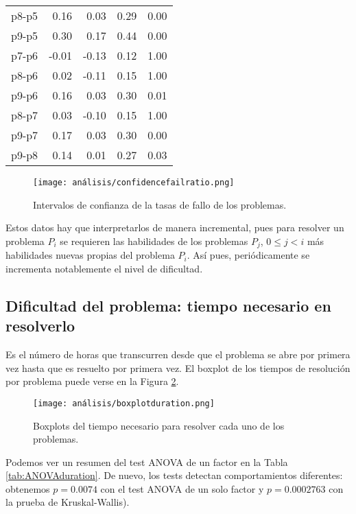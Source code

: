 \begin{table}[H]
\begin{tabular}{rrrrr}
  p8-p5 & 0.16 & 0.03 & 0.29 & 0.00 \\ 
  p9-p5 & 0.30 & 0.17 & 0.44 & 0.00 \\ 
  p7-p6 & -0.01 & -0.13 & 0.12 & 1.00 \\ 
  p8-p6 & 0.02 & -0.11 & 0.15 & 1.00 \\ 
  p9-p6 & 0.16 & 0.03 & 0.30 & 0.01 \\ 
  p8-p7 & 0.03 & -0.10 & 0.15 & 1.00 \\ 
  p9-p7 & 0.17 & 0.03 & 0.30 & 0.00 \\ 
  p9-p8 & 0.14 & 0.01 & 0.27 & 0.03 \\ 
   \hline
\end{tabular}
\end{table}

\begin{figure}[H]
    \centering
    \texttt{[image: análisis/confidencefailratio.png]}
    \caption{Intervalos de confianza de la tasas de fallo de los problemas.}
    \label{fig:confidenceratiofail}
\end{figure}

Estos datos hay que interpretarlos de manera incremental, pues para resolver un problema $P_i$ se requieren las habilidades de los problemas $P_j$, $0\leq j < i$ más habilidades nuevas propias del problema $P_i$. Así pues, periódicamente se incrementa notablemente el nivel de dificultad. %

\subsection{Dificultad del problema: tiempo necesario en resolverlo}

Es el número de horas que transcurren desde que el problema se abre por primera vez hasta que es resuelto por primera vez. El boxplot de los tiempos de resolución por problema puede verse en la Figura \ref{fig:boxplotduration}.

\begin{figure}[H]
    \centering
    \texttt{[image: análisis/boxplotduration.png]}
    \caption{Boxplots del tiempo necesario para resolver cada uno de los problemas.}
    \label{fig:boxplotduration}
\end{figure}

Podemos ver un resumen del test ANOVA de un factor en la Tabla \ref{tab:ANOVAduration}. De nuevo, los tests detectan comportamientos diferentes: obtenemos $p=0.0074$ con el test ANOVA de un solo factor y $p=0.0002763$ con la prueba de Kruskal-Wallis).

